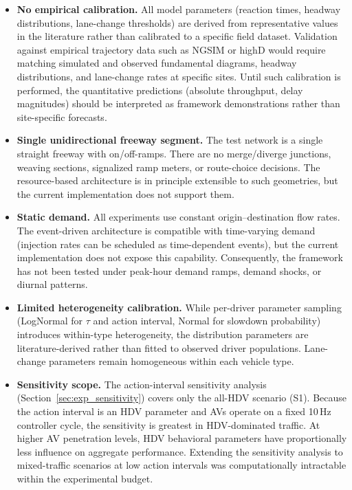 \documentclass[review,authoryear]{elsarticle}
\begin{document}
\begin{itemize}
    \item \textbf{No empirical calibration.} All model parameters (reaction times, headway distributions, lane-change thresholds) are derived from representative values in the literature rather than calibrated to a specific field dataset. Validation against empirical trajectory data such as NGSIM or highD would require matching simulated and observed fundamental diagrams, headway distributions, and lane-change rates at specific sites. Until such calibration is performed, the quantitative predictions (absolute throughput, delay magnitudes) should be interpreted as framework demonstrations rather than site-specific forecasts.

    \item \textbf{Single unidirectional freeway segment.} The test network is a single straight freeway with on/off-ramps. There are no merge/diverge junctions, weaving sections, signalized ramp meters, or route-choice decisions. The resource-based architecture is in principle extensible to such geometries, but the current implementation does not support them.

    \item \textbf{Static demand.} All experiments use constant origin--destination flow rates. The event-driven architecture is compatible with time-varying demand (injection rates can be scheduled as time-dependent events), but the current implementation does not expose this capability. Consequently, the framework has not been tested under peak-hour demand ramps, demand shocks, or diurnal patterns.

    \item \textbf{Limited heterogeneity calibration.} While per-driver parameter sampling (LogNormal for $\tau$ and action interval, Normal for slowdown probability) introduces within-type heterogeneity, the distribution parameters are literature-derived rather than fitted to observed driver populations. Lane-change parameters remain homogeneous within each vehicle type.

    \item \textbf{Sensitivity scope.} The action-interval sensitivity analysis (Section~\ref{sec:exp_sensitivity}) covers only the all-HDV scenario (S1). Because the action interval is an HDV parameter and AVs operate on a fixed 10\,Hz controller cycle, the sensitivity is greatest in HDV-dominated traffic. At higher AV penetration levels, HDV behavioral parameters have proportionally less influence on aggregate performance. Extending the sensitivity analysis to mixed-traffic scenarios at low action intervals was computationally intractable within the experimental budget.


\end{itemize}
\end{document}
